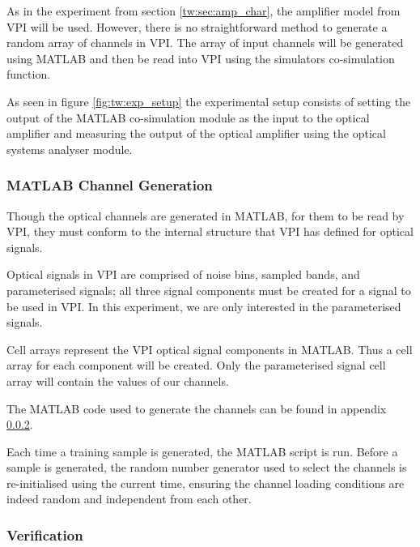 As in the experiment from section \ref{tw:sec:amp_char}, the amplifier model from VPI will be used. However, there is no straightforward method to generate a random array of channels in VPI. The array of input channels will be generated using MATLAB and then be read into VPI using the simulators co-simulation function.

As seen in figure \ref{fig:tw:exp_setup} the experimental setup consists of setting the output of the MATLAB co-simulation module as the input to the optical amplifier and measuring the output of the optical amplifier using the optical systems analyser module. 


\subsubsection{MATLAB Channel Generation} \FloatBarrier

Though the optical channels are generated in MATLAB, for them to be read by VPI, they must conform to the internal structure that VPI has defined for optical signals. 

Optical signals in VPI are comprised of noise bins, sampled bands, and parameterised signals; all three signal components must be created for a signal to be used in VPI. 
In this experiment, we are only interested in the parameterised signals.

Cell arrays represent the VPI optical signal components in MATLAB. Thus a cell array for each component will be created. Only the parameterised signal cell array will contain the values of our channels.  

The MATLAB code used to generate the channels can be found in appendix \ref{}.

Each time a training sample is generated, the MATLAB script is run. Before a sample is generated, the random number generator used to select the channels is re-initialised using the current time, ensuring the channel loading conditions are indeed random and independent from each other. 


\subsubsection{Verification}

